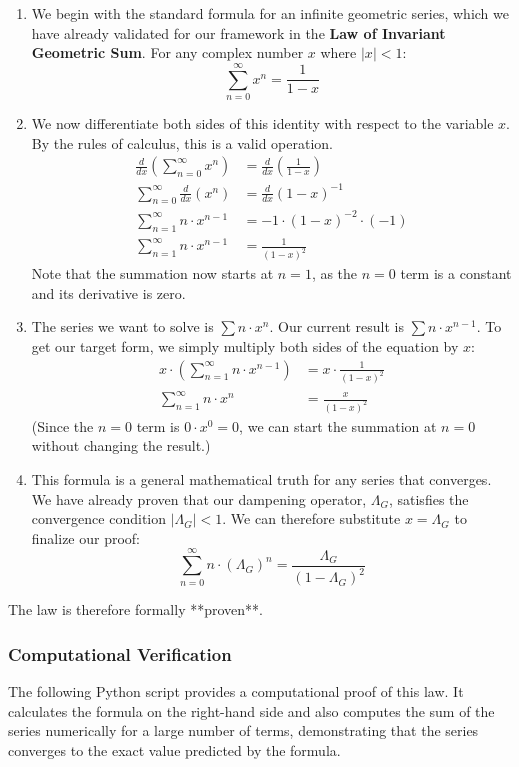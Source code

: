 \begin{enumerate}
    \item We begin with the standard formula for an infinite geometric series, which we have already validated for our framework in the \textbf{Law of Invariant Geometric Sum}. For any complex number $x$ where $|x| < 1$:
    $$ \sum_{n=0}^{\infty} x^n = \frac{1}{1-x} $$

    \item We now differentiate both sides of this identity with respect to the variable $x$. By the rules of calculus, this is a valid operation.
    \begin{align*}
        \frac{d}{dx} \left( \sum_{n=0}^{\infty} x^n \right) &= \frac{d}{dx} \left( \frac{1}{1-x} \right) \\
        \sum_{n=0}^{\infty} \frac{d}{dx} (x^n) &= \frac{d}{dx} (1-x)^{-1} \\
        \sum_{n=1}^{\infty} n \cdot x^{n-1} &= -1 \cdot (1-x)^{-2} \cdot (-1) \\
        \sum_{n=1}^{\infty} n \cdot x^{n-1} &= \frac{1}{(1-x)^2}
    \end{align*}
    Note that the summation now starts at $n=1$, as the $n=0$ term is a constant and its derivative is zero.

    \item The series we want to solve is $\sum n \cdot x^n$. Our current result is $\sum n \cdot x^{n-1}$. To get our target form, we simply multiply both sides of the equation by $x$:
    \begin{align*}
        x \cdot \left( \sum_{n=1}^{\infty} n \cdot x^{n-1} \right) &= x \cdot \frac{1}{(1-x)^2} \\
        \sum_{n=1}^{\infty} n \cdot x^{n} &= \frac{x}{(1-x)^2}
    \end{align*}
    (Since the $n=0$ term is $0 \cdot x^0 = 0$, we can start the summation at $n=0$ without changing the result.)

    \item This formula is a general mathematical truth for any series that converges. We have already proven that our dampening operator, $\Lambda_G$, satisfies the convergence condition $|\Lambda_G| < 1$. We can therefore substitute $x = \Lambda_G$ to finalize our proof:
    $$ \sum_{n=0}^{\infty} n \cdot (\Lambda_G)^n = \frac{\Lambda_G}{(1-\Lambda_G)^2} $$
\end{enumerate}
The law is therefore formally **proven**.

\subsubsection*{Computational Verification}
The following Python script provides a computational proof of this law. It calculates the formula on the right-hand side and also computes the sum of the series numerically for a large number of terms, demonstrating that the series converges to the exact value predicted by the formula.


